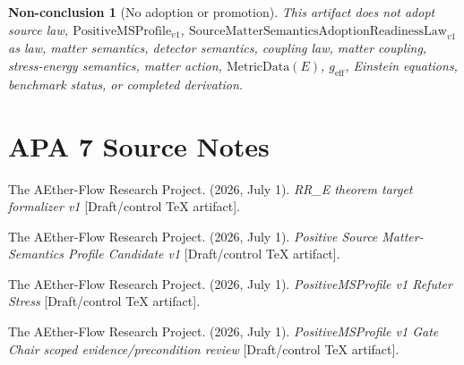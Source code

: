 \documentclass[11pt]{article}
\newcommand{\SMSAR}{\mathrm{SourceMatterSemanticsAdoptionReadinessLaw}_{v1}}
\newcommand{\PMSProf}{\mathrm{PositiveMSProfile}_{v1}}
\newcommand{\MetricData}{\mathrm{MetricData}}
\newcommand{\geff}{g_{\mathrm{eff}}}
\newtheorem{nonconclusion}{Non-conclusion}
\begin{document}
\begin{nonconclusion}[No adoption or promotion]
This artifact does not adopt source law, \(\PMSProf\), \(\SMSAR\) as law,
matter semantics, detector semantics, coupling law, matter coupling,
stress-energy semantics, matter action, \(\MetricData(E)\), \(\geff\),
Einstein equations, benchmark status, or completed derivation.
\end{nonconclusion}

\section{APA 7 Source Notes}

The AEther-Flow Research Project. (2026, July 1). \textit{RR\_E theorem target
formalizer v1} [Draft/control TeX artifact].

The AEther-Flow Research Project. (2026, July 1). \textit{Positive Source
Matter-Semantics Profile Candidate v1} [Draft/control TeX artifact].

The AEther-Flow Research Project. (2026, July 1). \textit{PositiveMSProfile v1
Refuter Stress} [Draft/control TeX artifact].

The AEther-Flow Research Project. (2026, July 1). \textit{PositiveMSProfile v1
Gate Chair scoped evidence/precondition review} [Draft/control TeX artifact].
\end{document}
